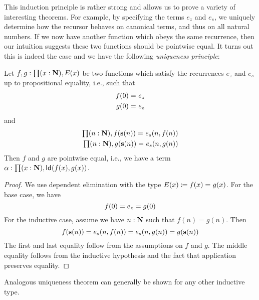 This induction principle is rather strong and allows us to prove a variety of interesting theorems. For example, by specifying the terms $e_z$ and $e_s$, we  uniquely determine how the recursor behaves on canonical terms, and thus on all natural numbers. If we now have another function which obeys the same recurrence, then our intuition suggests these two functions should be pointwise equal. It turns out this is indeed the case and we have the following \emph{uniqueness principle}:

\begin{thm}
Let $f,g : \prd{x:\nat} E(x)$ be two functions which satisfy the recurrences $e_z$ and $e_s$ up to propositional equality, i.e., such that
\begin{align*}
f(0) =_{} e_z \\ 
g(0) =_{} e_z
\end{align*}
and 
\begin{align*}
\prd{n : \nat} \id{f(\s(n))}{e_s(n, f(n))} \\
\prd{n : \nat} \id{g(\s(n))}{e_s(n, g(n))}
\end{align*}
Then $f$ and $g$ are pointwise equal, i.e., we have a term $\alpha : \prd{x : \nat} \idtype{f(x)}{g(x)}$.
\end{thm}

\begin{proof}
We use dependent elimination with the type $E(x) \coloneqq f(x) =_{} g(x)$. For the base case, we have \[f(0) = e_z = g(0)\]
For the inductive case, assume we have $n : \mathbf{N}$ such that $f(n) = g(n)$. Then
\[ f(\mathbf{s}(n)) = e_s(n, f(n)) = e_s(n, g(n)) = g(\mathbf{s}(n)) \]
The first and last equality follow from the assumptions on $f$ and $g$. The middle equality follows from the inductive hypothesis and the fact that application preserves equality.
\end{proof}
Analogous uniqueness theorem can generally be shown for any other inductive type.

